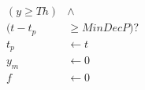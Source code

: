 \documentclass[10pt]{article}
\begin{document}
\begin{align*}(y\geq Th )&\wedge \\(t-t_p &\geq MinDecP)? \\
t_p & \leftarrow t \\
y_{m} & \leftarrow 0 \\
f & \leftarrow 0\end{align*}
\end{document}
